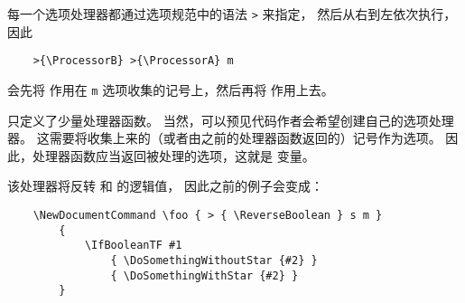 \documentclass{l3doc}
\begin{document}
每一个选项处理器都通过选项规范中的语法 \texttt{>} 来指定，
然后从右到左依次执行，因此
\begin{verbatim}
    >{\ProcessorB} >{\ProcessorA} m
\end{verbatim}
%
会先将  作用在 \texttt{m} 选项收集的记号上，然后再将  作用上去。

\begin{variable}{\ProcessedArgument}
 只定义了少量处理器函数。
当然，可以预见代码作者会希望创建自己的选项处理器。
这需要将收集上来的（或者由之前的处理器函数返回的）记号作为选项。
因此，处理器函数应当返回被处理的选项，这就是  变量。
%
\end{variable}

\begin{function}{\ReverseBoolean}
\begin{syntax}
\end{syntax}
该处理器将反转  和  的逻辑值，
因此之前的例子会变成：
\begin{verbatim}
    \NewDocumentCommand \foo { > { \ReverseBoolean } s m }
        {
            \IfBooleanTF #1
                { \DoSomethingWithoutStar {#2} }
                { \DoSomethingWithStar {#2} }
        }
\end{verbatim}
%
\end{function}
\end{document}
